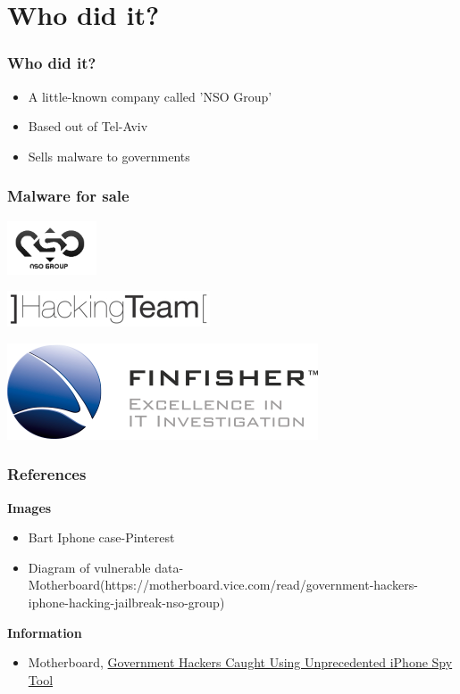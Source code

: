 \documentclass[12pt]{beamer}
\begin{document}
\section{Who did it?}
\begin{frame}
	\frametitle{Who did it?}
		\begin{itemize}
			\item A little-known company called 'NSO Group'
			\item Based out of Tel-Aviv
			\item Sells malware to governments
		\end{itemize}
\end{frame}

\begin{frame}
	\frametitle{Malware for sale}
	\includegraphics[width=.3\textwidth]{nso.png}
	\begin{center}
		\includegraphics[width=.3\textwidth]{hackingteam.png}
	\end{center}
	\begin{flushright}
		\includegraphics[width=.3\textwidth]{finfisher.png}
	\end{flushright}
\end{frame}

\begin{frame}
	\frametitle{References}
	\textbf{Images}
	\begin{itemize}
		\item Bart Iphone case-Pinterest
		\item Diagram of vulnerable data-Motherboard(https://motherboard.vice.com/read/government-hackers-iphone-hacking-jailbreak-nso-group)
	\end{itemize}
	\textbf{Information}
	\begin{itemize}
		\item Motherboard, \href{https://motherboard.vice.com/read/government-hackers-iphone-hacking-jailbreak-nso-group}{Government Hackers Caught Using Unprecedented iPhone Spy Tool}
	\end{itemize}
\end{frame}
\end{document}

